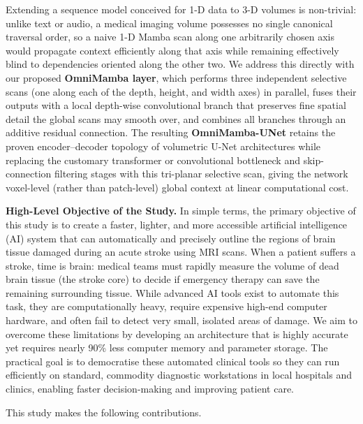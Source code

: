 \documentclass[pdflatex,sn-mathphys-num]{sn-jnl}
\begin{document}
Extending a sequence model conceived for 1-D data to 3-D volumes is
non-trivial: unlike text or audio, a medical imaging volume possesses
no single canonical traversal order, so a naive 1-D Mamba scan along
one arbitrarily chosen axis would propagate context efficiently along
that axis while remaining effectively blind to dependencies oriented
along the other two. We address this directly with our proposed
\textbf{OmniMamba layer}, which performs three independent selective
scans (one along each of the depth, height, and width axes) in
parallel, fuses their outputs with a local depth-wise convolutional
branch that preserves fine spatial detail the global scans may smooth
over, and combines all branches through an additive residual
connection. The resulting \textbf{OmniMamba-UNet} retains the
proven encoder--decoder topology of volumetric U-Net architectures
while replacing the customary transformer or convolutional bottleneck
and skip-connection filtering stages with this tri-planar selective
scan, giving the network voxel-level (rather than patch-level) global
context at linear computational cost.

\textbf{High-Level Objective of the Study.} In simple terms, the primary objective of this study is to create a faster, lighter, and more accessible artificial intelligence (AI) system that can automatically and precisely outline the regions of brain tissue damaged during an acute stroke using MRI scans. When a patient suffers a stroke, time is brain: medical teams must rapidly measure the volume of dead brain tissue (the stroke core) to decide if emergency therapy can save the remaining surrounding tissue. While advanced AI tools exist to automate this task, they are computationally heavy, require expensive high-end computer hardware, and often fail to detect very small, isolated areas of damage. We aim to overcome these limitations by developing an architecture that is highly accurate yet requires nearly 90\% less computer memory and parameter storage. The practical goal is to democratise these automated clinical tools so they can run efficiently on standard, commodity diagnostic workstations in local hospitals and clinics, enabling faster decision-making and improving patient care.

This study makes the following contributions.
\end{document}
